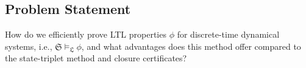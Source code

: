 



\subsection{Problem Statement}
 How do we efficiently prove LTL properties $\phi$ for discrete-time dynamical systems, i.e., $\mathfrak{S} \models_{\mathfrak{L}} \phi$, and what advantages does this method offer compared to the state-triplet method and closure certificates?

